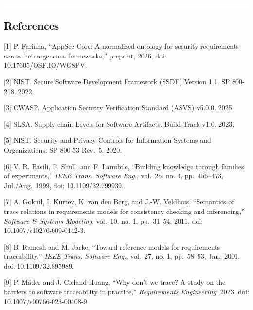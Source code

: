 \documentclass[
]{article}
\begin{document}
\begin{center}\rule{0.5\linewidth}{0.5pt}\end{center}

\subsection{References}\label{references}

{[}1{]} P. Farinha, ``AppSec Core: A normalized ontology for security
requirements across heterogeneous frameworks,'' preprint, 2026, doi:
10.17605/OSF.IO/WG8PV.

{[}2{]} NIST. Secure Software Development Framework (SSDF) Version 1.1.
SP 800-218. 2022.

{[}3{]} OWASP. Application Security Verification Standard (ASVS) v5.0.0.
2025.

{[}4{]} SLSA. Supply-chain Levels for Software Artifacts. Build Track
v1.0. 2023.

{[}5{]} NIST. Security and Privacy Controls for Information Systems and
Organizations. SP 800-53 Rev.~5. 2020.

{[}6{]} V. R. Basili, F. Shull, and F. Lanubile, ``Building knowledge
through families of experiments,'' \emph{IEEE Trans. Software Eng.},
vol.~25, no. 4, pp.~456--473, Jul./Aug.~1999, doi: 10.1109/32.799939.

{[}7{]} A. Goknil, I. Kurtev, K. van den Berg, and J.-W. Veldhuis,
``Semantics of trace relations in requirements models for consistency
checking and inferencing,'' \emph{Software \& Systems Modeling},
vol.~10, no. 1, pp.~31--54, 2011, doi: 10.1007/s10270-009-0142-3.

{[}8{]} B. Ramesh and M. Jarke, ``Toward reference models for
requirements traceability,'' \emph{IEEE Trans. Software Eng.}, vol.~27,
no. 1, pp.~58--93, Jan.~2001, doi: 10.1109/32.895989.

{[}9{]} P. Mäder and J. Cleland-Huang, ``Why don't we trace? A study on
the barriers to software traceability in practice,'' \emph{Requirements
Engineering}, 2023, doi: 10.1007/s00766-023-00408-9.
\end{document}
